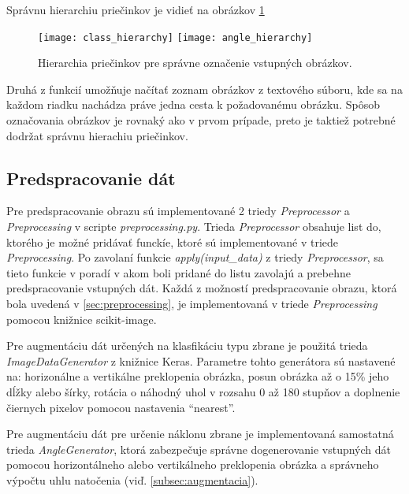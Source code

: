 Správnu hierarchiu priečinkov je vidieť na obrázkov \ref{pic:folderhierarchy}

\begin{figure}[H]
    \centering
    \texttt{[image: class\_hierarchy]}
    \qquad
    \texttt{[image: angle\_hierarchy]}
    \caption{Hierarchia priečinkov pre správne označenie vstupných obrázkov.}
    \label{pic:folderhierarchy}
\end{figure}

Druhá z funkcií umožňuje načítať zoznam obrázkov z textového súboru, kde sa na každom riadku nachádza práve jedna cesta k požadovanému obrázku.
Spôsob označovania obrázkov je rovnaký ako v prvom prípade, preto je taktiež potrebné dodržat správnu hierachiu priečinkov.

\subsection{Predspracovanie dát}
\label{subsec:predspracovaniedat}
Pre predspracovanie obrazu sú implementované 2 triedy \textit{Preprocessor} a \textit{Preprocessing} v scripte \textit{preprocessing.py}.
Trieda \textit{Preprocessor} obsahuje list do, ktorého je možné pridávať funckíe, ktoré sú implementované v triede \textit{Preprocessing}.
Po zavolaní funkcie \textit{apply(input\_data)} z triedy \textit{Preprocessor}, sa tieto
    funkcie v poradí v akom boli pridané do listu zavolajú a prebehne predspracovanie vstupných dát.
Každá z možností predspracovanie obrazu, ktorá bola uvedená v \ref{sec:preprocessing}, je implementovaná v triede \textit{Preprocessing} pomocou
    knižnice scikit-image.

Pre augmentáciu dát určených na klasfikáciu typu zbrane je použitá trieda \textit{ImageDataGenerator} z knižnice Keras.
Parametre tohto generátora sú nastavené na: horizonálne a vertikálne preklopenia obrázka, posun obrázka až o 15\% jeho dĺžky alebo šírky,
    rotácia o náhodný uhol v rozsahu 0 až 180 stupňov a doplnenie čiernych pixelov pomocou nastavenia ``nearest''.

Pre augmentáciu dát pre určenie náklonu zbrane je implementovaná samostatná trieda \textit{AngleGenerator}, ktorá zabezpečuje správne dogenerovanie
    vstupných dát pomocou horizontálneho alebo vertikálneho preklopenia obrázka a správneho výpočtu uhlu natočenia (viď. \ref{subsec:augmentacia}).

